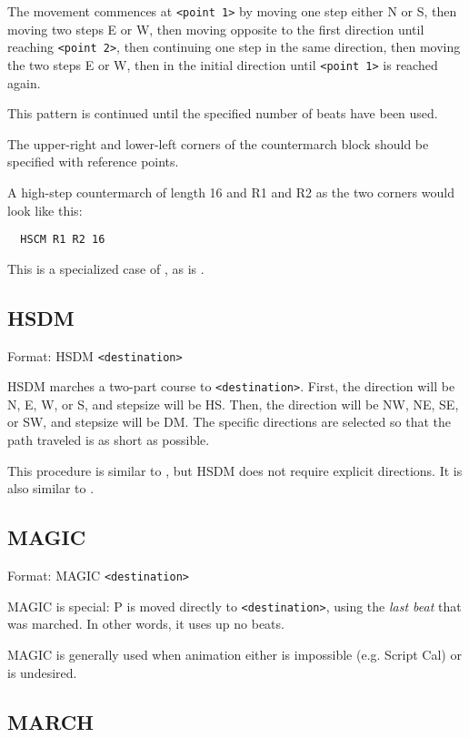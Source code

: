 The movement commences at \verb$<point 1>$ by moving one step either N or S,
then moving two steps E or W, then moving opposite to the first direction
until reaching \verb$<point 2>$, then continuing one step in the same
direction, then moving the two steps E or W, then in the initial direction
until \verb$<point 1>$ is reached again.

This pattern is continued until the specified number of beats have been used.

The upper-right and lower-left corners of the countermarch block should be
specified with reference points.

A high-step countermarch of length 16 and R1 and R2 as the two corners would
look like this:
\begin{verbatim}
  HSCM R1 R2 16
\end{verbatim}

This is a specialized case of , as is
.

\subsection{HSDM}\label{hsdm}

Format: HSDM \verb$<destination>$

HSDM marches a two-part course to \verb$<destination>$.  First, the
direction will be N, E, W, or S, and stepsize will be HS.  Then, the
direction will be NW, NE, SE, or SW, and stepsize will be DM.  The
specific directions are selected so that the path traveled is as short
as possible.

This procedure is similar to , but HSDM does
not require explicit directions.  It is also similar to .


\subsection{MAGIC}\label{magic}

Format: MAGIC \verb$<destination>$

MAGIC is special: P is moved directly to \verb$<destination>$, using the
{\it last beat} that was marched.  In other words, it uses up no beats.

MAGIC is generally used when animation either is impossible (e.g. Script
Cal) or is undesired.

\subsection{MARCH}\label{march}

